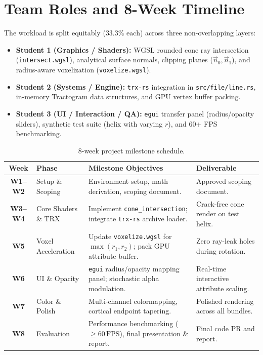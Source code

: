 \documentclass[10pt,a4paper]{article}
\begin{document}
\section{Team Roles and 8-Week Timeline}
The workload is split equitably ($33.3\%$ each) across three non-overlapping layers:
\begin{itemize}[leftmargin=*,nosep]
    \item \textbf{Student 1 (Graphics / Shaders):} WGSL rounded cone ray intersection (\texttt{intersect.wgsl}), analytical surface normals, clipping planes ($\vec{n}_0, \vec{n}_1$), and radius-aware voxelization (\texttt{voxelize.wgsl}).
    \item \textbf{Student 2 (Systems / Engine):} \texttt{trx-rs} integration in \texttt{src/file/line.rs}, in-memory Tractogram data structures, and GPU vertex buffer packing.
    \item \textbf{Student 3 (UI / Interaction / QA):} \texttt{egui} transfer panel (radius/opacity sliders), synthetic test suite (helix with varying $r$), and 60+ FPS benchmarking.
\end{itemize}

\begin{table}[ht!]
\centering
\small
\begin{tabularx}{\textwidth}{c l p{7.5cm} X}
\toprule
\textbf{Week} & \textbf{Phase} & \textbf{Milestone Objectives} & \textbf{Deliverable} \\
\midrule
\textbf{W1--W2} & Setup \& Scoping & Environment setup, math derivation, scoping document. & Approved scoping document. \\
\textbf{W3--W4} & Core Shaders \& TRX & Implement \texttt{cone\_intersection}; integrate \texttt{trx-rs} archive loader. & Crack-free cone render on test helix. \\
\textbf{W5} & Voxel Acceleration & Update \texttt{voxelize.wgsl} for $\max(r_1, r_2)$; pack GPU attribute buffer. & Zero ray-leak holes during rotation. \\
\textbf{W6} & UI \& Opacity & \texttt{egui} radius/opacity mapping panel; stochastic alpha modulation. & Real-time interactive attribute scaling. \\
\textbf{W7} & Color \& Polish & Multi-channel colormapping, cortical endpoint tapering. & Polished rendering across all bundles. \\
\textbf{W8} & Evaluation & Performance benchmarking ($\ge 60\,\text{FPS}$), final presentation \& report. & Final code PR and report. \\
\bottomrule
\end{tabularx}
\caption{8-week project milestone schedule.}
\label{tab:schedule}
\end{table}

\vspace{-0.3cm}


\end{document}
